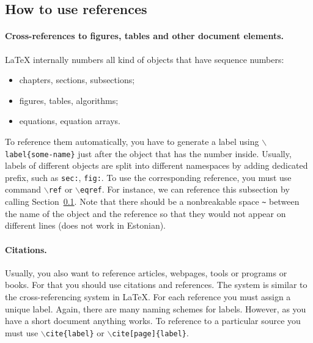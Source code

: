 \documentclass[12pt]{article}
\begin{document}
\subsection{How to use references} \label{sec:using_ref}

\paragraph{Cross-references to figures, tables and other document elements.}
LaTeX  internally numbers all kind of objects that have sequence numbers:
\begin{itemize}
\item chapters, sections, subsections;
\item figures, tables, algorithms;
\item equations, equation arrays.
\end{itemize}
To reference them automatically, you have to generate a label using \texttt{$\backslash$label\{some-name\}} just after the object that has the number inside. Usually, labels of different objects are split into different namespaces by adding dedicated prefix, such as \texttt{sec:}, \texttt{fig:}. To use the corresponding reference, you must use command \texttt{$\backslash$ref} or \texttt{$\backslash$eqref}. For instance, we can reference this subsection by calling Section~\ref{sec:using_ref}. Note that there should be a nonbreakable space \texttt{\~} between the name of the object and the reference so that they would not appear on different lines (does not work in Estonian).          



\paragraph{Citations.}
Usually, you also want to reference articles, webpages, tools or programs or books. For that you should use citations and references. The system is similar to the cross-referencing system in LaTeX. For each reference you must assign a unique label. Again, there are many naming schemes for labels. However, as you have a short document anything works. To reference to a particular source you must use \texttt{$\backslash$cite\{label\}} or \texttt{$\backslash$cite[page]\{label\}}. 
\end{document}
